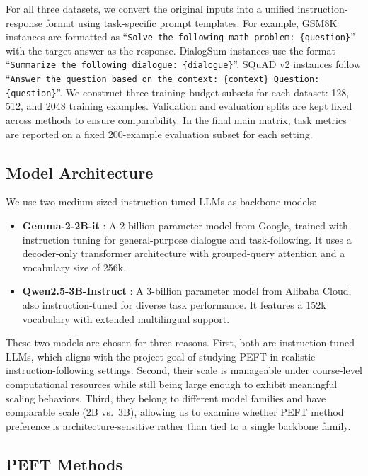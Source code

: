 \documentclass{article}
\begin{document}
For all three datasets, we convert the original inputs into a unified instruction-response format using task-specific prompt templates. For example, GSM8K instances are formatted as ``\texttt{Solve the following math problem: \{question\}}'' with the target answer as the response. DialogSum instances use the format ``\texttt{Summarize the following dialogue: \{dialogue\}}''. SQuAD v2 instances follow ``\texttt{Answer the question based on the context: \{context\} Question: \{question\}}''. We construct three training-budget subsets for each dataset: 128, 512, and 2048 training examples. Validation and evaluation splits are kept fixed across methods to ensure comparability. In the final main matrix, task metrics are reported on a fixed 200-example evaluation subset for each setting.

\subsection{Model Architecture}

We use two medium-sized instruction-tuned LLMs as backbone models:
\begin{itemize}
    \item \textbf{Gemma-2-2B-it} \cite{gemma2_2024}: A 2-billion parameter model from Google, trained with instruction tuning for general-purpose dialogue and task-following. It uses a decoder-only transformer architecture with grouped-query attention and a vocabulary size of 256k.
    \item \textbf{Qwen2.5-3B-Instruct} \cite{qwen25_2024}: A 3-billion parameter model from Alibaba Cloud, also instruction-tuned for diverse task performance. It features a 152k vocabulary with extended multilingual support.
\end{itemize}

These two models are chosen for three reasons. First, both are instruction-tuned LLMs, which aligns with the project goal of studying PEFT in realistic instruction-following settings. Second, their scale is manageable under course-level computational resources while still being large enough to exhibit meaningful scaling behaviors. Third, they belong to different model families and have comparable scale (2B vs.\ 3B), allowing us to examine whether PEFT method preference is architecture-sensitive rather than tied to a single backbone family.

\subsection{PEFT Methods}
\end{document}
